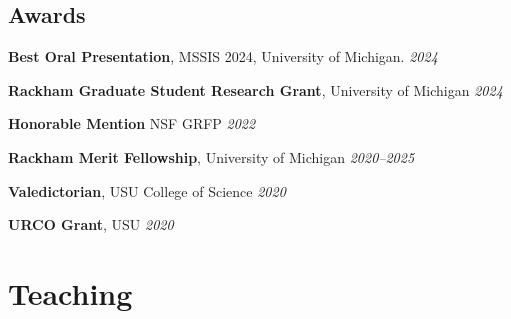 \documentclass[11pt]{article}
\newenvironment {reflist}
                {
                 \begin{list}{}
                 {\setlength{\labelwidth}{0mm}
                  \setlength{\leftmargin}{8mm}
                  \setlength{\itemindent}{-3mm}
                  \setlength{\labelsep}{0mm}
                  \setlength{\parsep}{0.1 ex}
                  \setlength{\itemsep}{0.1cm}
      \setlength{\topsep}{0.15cm}}} %
   {\end{list}}
\begin{document}
\begin{reflist}

\end{reflist}

\subsection*{Awards}

\noindent\hspace{5mm}\textbf{Best Oral Presentation}, MSSIS 2024, University of Michigan. \hfill {\textit{2024}}

\hspace{5mm}{\it Award amount: $\$200$}


\vspace{2mm}
\noindent\hspace{5mm}\textbf{Rackham Graduate Student Research Grant}, University of Michigan \hfill {\textit{2024}}

\hspace{5mm}{\it Award amount: $\$2500$}

\vspace{2mm}
\noindent\hspace{5mm}\textbf{Honorable Mention} NSF GRFP \hfill {\textit{2022}}

\vspace{2mm}
\noindent\hspace{5mm}\textbf{Rackham Merit Fellowship}, University of Michigan \hfill {\textit{2020--2025}}

\hspace{5mm}{\it Award amount: Three years of PhD student funding.}

\vspace{2mm}
\noindent\hspace{5mm}\textbf{Valedictorian}, USU College of Science \hfill {\textit{2020}}

\vspace{2mm}
\noindent\hspace{5mm}\textbf{URCO Grant}, USU \hfill  {\textit{2020}}

\hspace{5mm}{\it Award amount: $\$1000$}

\section*{Teaching}
\end{document}
